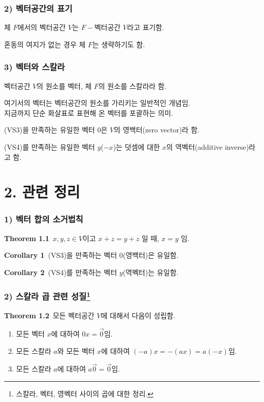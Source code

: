 \subsubsection*{2) 벡터공간의 표기}
체 $F$에서의 벡터공간 $V$는 $F-$벡터공간 $V$라고 표기함.

혼동의 여지가 없는 경우 체 $F$는 생략하기도 함.

\subsubsection*{3) 벡터와 스칼라}
벡터공간 $V$의 원소를 벡터, 체 $F$의 원소를 스칼라라 함.

여기서의 벡터는 벡터공간의 원소를 가리키는 일반적인 개념임.\\
지금까지 단순 화살표로 표현해 온 벡터를 포괄하는 의미.

(VS3)을 만족하는 유일한 벡터 $0$은 $V$의 영백터(zero vector)라 함.

(VS4)를 만족하는 유일한 벡터 $y$($-x$)는 덧셈에 대한 $x$의 역벡터(additive inverse)라고 함.


\newpage


\section*{2. 관련 정리}
\subsubsection*{1) 벡터 합의 소거법칙}
\textbf{Theorem 1.1}\, $x,y,z \in V$이고 $x+z=y+z$ 일 때, $x = y$ 임.

\textbf{Corollary 1}\, (VS3)을 만족하는 벡터 $0$(영백터)은 유일함.

\textbf{Corollary 2}\, (VS4)를 만족하는 벡터 $y$(역벡터)는 유일함.

\subsubsection*{2) 스칼라 곱 관련 성질\footnote{스칼라, 벡터, 영벡터 사이의 곱에 대한 정리.}}

\textbf{Theorem 1.2}\, 모든 벡터공간 $V$에 대해서 다음이 성립함.

\begin{enumerate}
    \item 모든 벡터 $x$에 대하여 $0x= \vec{0}$임.
    \item 모든 스칼라 $a$와 모든 벡터 $x$에 대하여 $(-a)x=-(ax)=a(-x)$임.
    \item 모든 스칼라 $a$에 대하여 $a \vec{0} = \vec{0}$임.\\
\end{enumerate}



